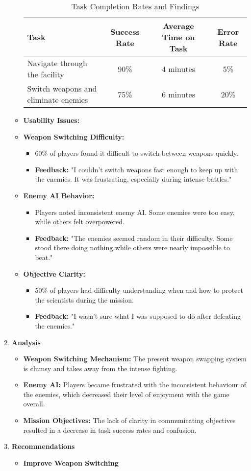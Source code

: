 \begin{enumerate}
\begin{itemize}
\begin{table}[h]
			\centering
			\caption{Task Completion Rates and Findings}
			\begin{tabular}{|l|c|c|c|}
				\hline
				\textbf{Task} & \textbf{Success Rate} & \textbf{Average Time on Task} & \textbf{Error Rate} \\ \hline
				Navigate through the facility & 90\% & 4 minutes & 5\% \\ \hline
				Switch weapons and eliminate enemies & 75\% & 6 minutes & 20\% \\ \hline
			\end{tabular}
		\end{table}
	\item \textbf{Usability Issues:}
		\item \textbf{Weapon Switching Difficulty:}
	\begin{itemize}
		\item {60\% of players found it difficult to switch between weapons quickly.}
		\item {\textbf{Feedback:} "I couldn't switch weapons fast enough to keep up with the enemies. It was frustrating, especially during intense battles."}
	\end{itemize}
	\item \textbf{Enemy AI Behavior:}
	\begin{itemize}
		\item {Players noted inconsistent enemy AI. Some enemies were too easy, while others felt overpowered.}
		\item {\textbf{Feedback:} "The enemies seemed random in their difficulty. Some stood there doing nothing while others were nearly impossible to beat."}
	\end{itemize}
	\item \textbf{Objective Clarity:}
	\begin{itemize}
		\item {50\% of players had difficulty understanding when and how to protect the scientists during the mission.}
		\item{ \textbf{Feedback:} "I wasn't sure what I was supposed to do after defeating the enemies."}
	\end{itemize}
	\end{itemize}
	\item \textbf{Analysis}
	\begin{itemize}
		\item \textbf{Weapon Switching Mechanism:}
		The present weapon swapping system is clumsy and takes away from the intense fighting.
		\item \textbf{Enemy AI:}
		Players became frustrated with the inconsistent behaviour of the enemies, which decreased their level of enjoyment with the game overall.
		\item \textbf{Mission Objectives:}
		The lack of clarity in communicating objectives resulted in a decrease in task success rates and confusion.
	\end{itemize}
		\item \textbf{Recommendations}
	\begin{itemize}
		\item \textbf{Improve Weapon Switching}


\end{itemize}
\end{enumerate}
